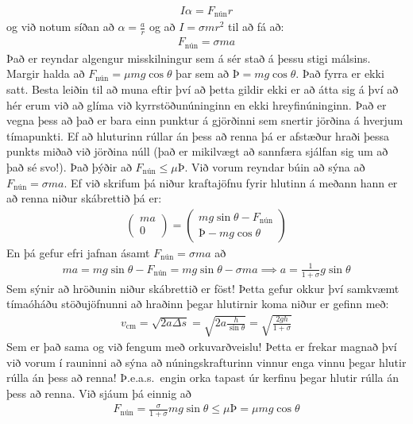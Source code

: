 \begin{align*}
   I\alpha = F_{\text{nún}}r
\end{align*}
og við notum síðan að $\alpha = \frac{a}{r}$ og að $I = \sigma mr^2$ til að fá að:
\begin{align*}
    F_{\text{nún}} = \sigma m a
\end{align*}
Það er reyndar algengur misskilningur sem á sér stað á þessu stigi málsins. Margir halda að $F_{\text{nún}} = \mu mg\cos\theta$ þar sem að $Þ = mg\cos\theta$. Það fyrra er ekki satt. Besta leiðin til að muna eftir því að þetta gildir ekki er að átta sig á því að hér erum við að glíma við kyrrstöðunúninginn en ekki hreyfinúninginn. Það er vegna þess að það er bara einn punktur á gjörðinni sem snertir jörðina á hverjum tímapunkti. Ef að hluturinn rúllar án þess að renna þá er afstæður hraði þessa punkts miðað við jörðina núll (það er mikilvægt að sannfæra sjálfan sig um að það sé svo!). Það þýðir að $F_{\text{nún}} \leq \mu Þ$. Við vorum reyndar búin að sýna að $F_{\text{nún}} = \sigma ma$. Ef við skrifum þá niður kraftajöfnu fyrir hlutinn á meðann hann er að renna niður skábrettið þá er:
\begin{align*}
    \begin{pmatrix} ma \\ 0 \end{pmatrix} =  \begin{pmatrix} mg\sin\theta - F_{\text{nún}} \\ Þ - mg\cos\theta \end{pmatrix}
\end{align*}
En þá gefur efri jafnan ásamt $F_{\text{nún}} = \sigma ma$ að
\begin{align*}
    ma = mg\sin\theta - F_{\text{nún}} = mg\sin\theta - \sigma ma \implies a = \frac{1}{1+\sigma} g\sin\theta
\end{align*}
Sem sýnir að hröðunin niður skábrettið er föst! Þetta gefur okkur því samkvæmt tímaóháðu stöðujöfnunni að hraðinn þegar hlutirnir koma niður er gefinn með:
\begin{align*}
    v_{\text{cm}} = \sqrt{2a\Delta s} = \sqrt{2a \frac{h}{\sin\theta}} = \sqrt{\frac{2gh}{1+\sigma}}
\end{align*}
Sem er það sama og við fengum með orkuvarðveislu! Þetta er frekar magnað því við vorum í rauninni að sýna að núningskrafturinn vinnur enga vinnu þegar hlutir rúlla án þess að renna! Þ.e.a.s.~engin orka tapast úr kerfinu þegar hlutir rúlla án þess að renna. Við sjáum þá einnig að
\begin{align*}
    F_{\text{nún}} = \frac{\sigma}{1+\sigma} mg\sin\theta \leq \mu Þ = \mu mg\cos\theta
\end{align*}
